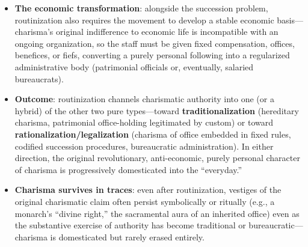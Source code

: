 \documentclass[12pt]{article}
\begin{document}
\begin{itemize}[leftmargin=*, itemsep=4pt]
\begin{itemize}
        \item \textbf{Hereditary charisma (\textit{Erbcharisma})}: belief that charisma is transmitted through blood/lineage, so that legitimate authority passes to relatives (often by primogeniture) of the original charismatic figure, regardless of whether the heir personally displays extraordinary qualities. This is a decisive step toward \textbf{traditional} authority, since legitimacy now attaches to birth/lineage rather than to demonstrated personal charisma.
        \item \textbf{Charisma of office (\textit{Amtscharisma})}: the charismatic quality is detached from the specific person and transferred to the \textbf{office} or institution itself (e.g., the sacramental charisma of priestly office, transmitted via ordination/ritual regardless of the individual priest's personal holiness)---a decisive step toward \textbf{legal-rational/institutional} authority, since the office now carries authority independent of the incumbent's personal qualities.
    \end{itemize}
    \item \textbf{The economic transformation}: alongside the succession problem, routinization also requires the movement to develop a stable economic basis---charisma's original indifference to economic life is incompatible with an ongoing organization, so the staff must be given fixed compensation, offices, benefices, or fiefs, converting a purely personal following into a regularized administrative body (patrimonial officials or, eventually, salaried bureaucrats).
    \item \textbf{Outcome}: routinization channels charismatic authority into one (or a hybrid) of the other two pure types---toward \textbf{traditionalization} (hereditary charisma, patrimonial office-holding legitimated by custom) or toward \textbf{rationalization/legalization} (charisma of office embedded in fixed rules, codified succession procedures, bureaucratic administration). In either direction, the original revolutionary, anti-economic, purely personal character of charisma is progressively domesticated into the ``everyday.''
    \item \textbf{Charisma survives in traces}: even after routinization, vestiges of the original charismatic claim often persist symbolically or ritually (e.g., a monarch's ``divine right,'' the sacramental aura of an inherited office) even as the substantive exercise of authority has become traditional or bureaucratic---charisma is domesticated but rarely erased entirely.
\end{itemize}
\end{document}
